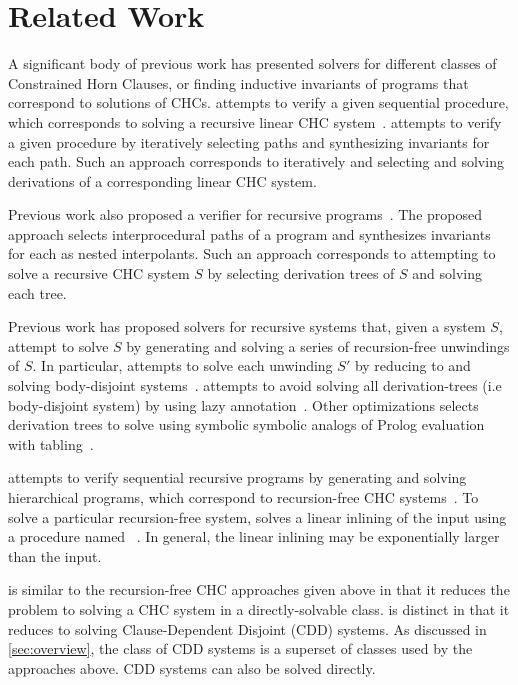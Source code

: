 \section{Related Work}
\label{sec:related-work}
A significant body of previous work has presented solvers for
different classes of Constrained Horn Clauses, or finding inductive
invariants of programs that correspond to solutions of CHCs.
\impact attempts to verify a given sequential procedure, which
corresponds to solving a recursive linear CHC
system~\cite{mcmillan06}.
%
\impact attempts to verify a given procedure by iteratively selecting
paths and synthesizing invariants for each path.
%
Such an approach corresponds to iteratively and selecting and solving
derivations of a corresponding linear CHC system.

Previous work also proposed a verifier for recursive
programs~\cite{heizmann10}.
%
The proposed approach selects interprocedural paths of a program and
synthesizes invariants for each as nested interpolants.
%
Such an approach corresponds to attempting to solve a recursive CHC
system $S$ by selecting derivation trees of $S$
and solving each tree.

Previous work has proposed solvers for recursive systems that, given a
system $S$, attempt to solve $S$ by generating and
solving a series of recursion-free unwindings of $S$.
%
In particular, \eldarica attempts to solve each unwinding
$S'$ by reducing to and solving body-disjoint systems~\cite{rummer13a,rummer13b}.
%
\duality attempts to avoid solving all derivation-trees (i.e
body-disjoint system) by using lazy annotation~\cite{bjorner13}.
%
Other optimizations selects derivation trees to solve using symbolic
symbolic analogs of Prolog evaluation with
tabling~\cite{jaffar09,mcmillan14}.
%

\whale attempts to verify sequential recursive programs by generating
and solving hierarchical programs, which correspond to recursion-free CHC
systems~\cite{albarghouthi12b}.
%
To solve a particular recursion-free system, \whale solves a linear
inlining of the input using a procedure named
\vinta~\cite{albarghouthi12a}.
%
In general, the linear inlining may be exponentially larger than the
input.

\sys is similar to the recursion-free CHC approaches given above in
that it reduces the problem to solving a CHC system in a
directly-solvable class.
%
\sys is distinct in that it reduces to solving Clause-Dependent
Disjoint (CDD) systems.
%
As discussed in \autoref{sec:overview}, the class of CDD systems is a
superset of classes used by the approaches above. CDD systems can
also be solved directly.

